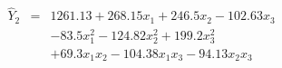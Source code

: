 

\[
 \begin{array}{lll} \hat{Y}_{2} & = & 1261.13 + 268.15x_1 + 246.5x_2 - 102.63x_3 \\ & & - 83.5x_{1}^2 - 124.82x_{2}^2 + 199.2x_{3}^2 \\ & & + 69.3x_{1}x_{2} - 104.38x_{1}x_{3} - 94.13x_{2}x_{3} \end{array}
\]


